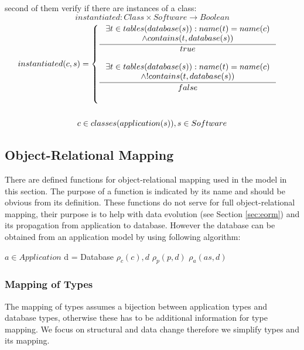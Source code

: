 \documentclass[11pt]{article}
\begin{document}
second of them verify if there are instances of a class:
$$instantiated : Class \times Software \rightarrow Boolean $$ 
\begin{equation*}
\begin{gathered}
	instantiated(c, s) = \begin{cases}
 \inference{\exists t \in tables(database(s)) : name(t) = name(c) \\ \wedge contains(t, database(s))}{true} \\ \\
  \inference{\exists t \in tables(database(s)) : name(t) = name(c) \\ \wedge ! contains(t, database(s))}{false} \\ \\
 \end{cases} \\ \\
 c \in classes(application(s)), s \in Software 
\end{gathered}
\end{equation*}

\subsection{Object-Relational Mapping}
\label{sec:orm}
There are defined functions for object-relational mapping used in the model in this section. The purpose of a function is indicated by its name and should be obvious from its definition. These functions do not serve for full object-relational mapping, their purpose is to help with data evolution (see Section \ref{sec:eorm}) and its propagation from application to database. However the database can be obtained from an application model by using following algorithm:

\begin{algorithmic}[1]
	\Require $a \in Application$
	\State d = Database
		\State $\rho_c(c), d$
			\State $\rho_p(p, d)$
		\EndFor
	 \EndFor
			\State $\rho_{a}(as, d)$
		\EndFor
	\EndFor
\end{algorithmic}


\subsubsection{Mapping of Types}
The mapping of types assumes a bijection between application types and database types, otherwise these has to be additional information for type mapping. We focus on structural and data change therefore we simplify types and its mapping.
\end{document}
